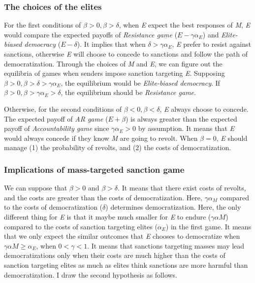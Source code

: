 \documentclass[11pt, letterpage, titlepage]{article}
\begin{document}
\subsubsection*{The choices of the elites}
	
For the first conditions of $\beta > 0, \beta > \delta$, when \textit{E} expect the best responses of \textit{M}, \textit{E} would compare the expected payoffs of \textit{Resistance game} ($E-\gamma\alpha_{E}$) and \textit{Elite-biased democracy} ($E-\delta$). It implies that when $\delta > \gamma\alpha_{E}$, \textit{E} prefer to resist against sanctions, otherwise \textit{E} will choose to concede to sanctions and follow the path of democratization. Through the choices of \textit{M} and \textit{E}, we can figure out the equilibria of games when senders impose sanction targeting \textit{E}. Supposing $\beta > 0, \beta > \delta > \gamma\alpha_{E}$, the equilibrium would be \textit{Elite-biased democracy}. If $\beta > 0, \beta > \gamma\alpha_{E} > \delta$, the equilibrium should be \textit{Resistance game}.
	
Otherwise, for the second conditions of $\beta <0, \beta < \delta$, \textit{E} always choose to concede. The expected payoff of \textit{AR game} ($E + \beta$) is always greater than the expected payoff of \textit{Accountability game} since $\gamma\alpha_{E} > 0$ by assumption. It means that \textit{E} would always concede if they know \textit{M} are going to revolt. When $\beta = 0$, \textit{E} should manage (1) the probability of revolts, and (2) the costs of democratization.
	
\subsubsection*{Implications of mass-targeted sanction game}
We can suppose that $\beta > 0$ and $\beta > \delta$. It means that there exist costs of revolts, and the costs are greater than the costs of democratization. Here, $\gamma\alpha_{M}$ compared to the costs of democratization ($\delta$) determines democratization. Here, the only different thing for \textit{E} is that it maybe much smaller for \textit{E} to endure ($\gamma\alpha{M}$) compared to the costs of sanction targeting elites ($\alpha_{E}$) in the first game. It means that we only expect the similar outcomes that \textit{E} chooses to democratize when $\gamma\alpha{M} \geq \alpha_{E}$, when $0 < \gamma < 1$. It means that sanctions targeting masses may  lead democratizations only when their costs are much higher than the costs of sanction targeting elites as much as elites think sanctions are more harmful than democratization. I draw the second hypothesis as follows.
	
\end{document}
